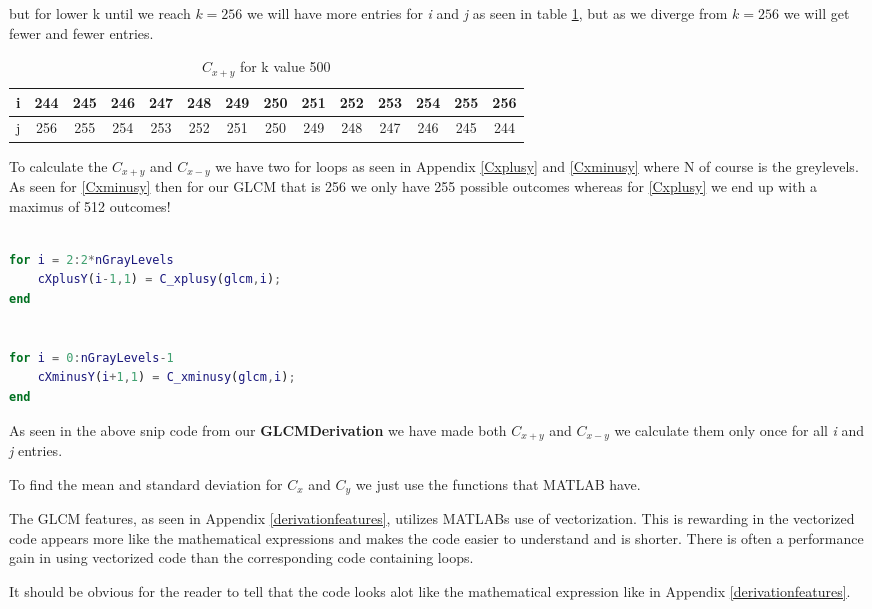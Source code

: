 but for lower k until we reach $k=256$ we will have more entries for \textit{i} and \textit{j} as seen in table \ref{tab:cxplusyk500}, but as we diverge from $k=256$ we will get fewer and fewer entries.

\begin{table}[H]
  \centering
    \begin{tabular}{|c|c|c|c|c|c|c|c|c|c|c|c|c|c|}
    \hline
    i     & 244   & 245   & 246   & 247   & 248   & 249   & 250   & 251   & 252   & 253   & 254   & 255   & 256 \\
    \hline
    j     & 256   & 255   & 254   & 253   & 252   & 251   & 250   & 249   & 248   & 247   & 246   & 245   & 244 \\
    \hline
    \end{tabular}%
  \caption{$C_{x+y}$ for k value 500}\label{tab:cxplusyk500}%
\end{table}%

To calculate the $C_{x+y}$ and $C_{x-y}$ we have two for loops as seen in Appendix \ref{Cxplusy} and \ref{Cxminusy} where N of course is the greylevels. As seen for \ref{Cxminusy} then for our GLCM that is 256 we only have 255 possible outcomes whereas for \ref{Cxplusy} we end up with a maximus of 512 outcomes!

\begin{lstlisting}[language=Matlab]

for i = 2:2*nGrayLevels
    cXplusY(i-1,1) = C_xplusy(glcm,i);
end


for i = 0:nGrayLevels-1
    cXminusY(i+1,1) = C_xminusy(glcm,i);
end
\end{lstlisting}

As seen in the above snip code from our \textbf{GLCMDerivation} we have made both $C_{x+y}$ and $C_{x-y}$ we calculate them only once for all \textit{i} and \textit{j} entries.

To find the mean and standard deviation for $C_x$ and $C_y$ we just use the functions that MATLAB have.

The GLCM features, as seen in Appendix \ref{derivationfeatures}, utilizes MATLABs use of vectorization. This is rewarding in the vectorized code appears more like the mathematical expressions and makes the code easier to understand and is shorter. There is often a performance gain in using vectorized code than the corresponding code containing loops.

It should be obvious for the reader to tell that the code looks alot like the mathematical expression like in Appendix \ref{derivationfeatures}.

